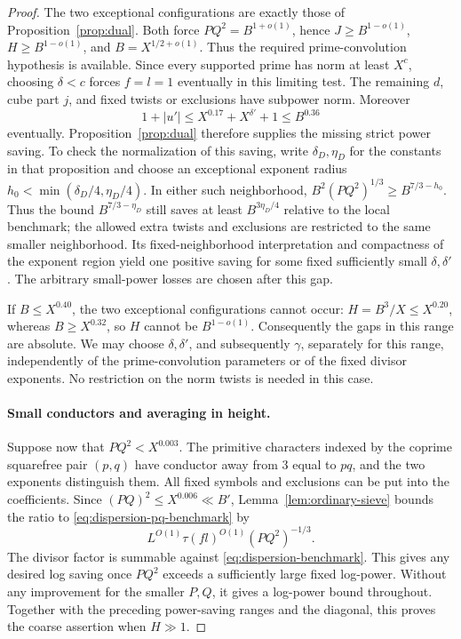 \begin{proof}
The two exceptional configurations are exactly those of
Proposition~\ref{prop:dual}. Both force $PQ^2=B^{1+o(1)}$, hence
$J\ge B^{1-o(1)}$, $H\ge B^{1-o(1)}$, and
$B=X^{1/2+o(1)}$. Thus the required prime-convolution hypothesis is
available. Since every supported prime has norm at least $X^c$, choosing
$\delta<c$ forces $f=l=1$ eventually in this limiting test.
The remaining $d$, cube part $j$, and fixed twists or exclusions have
subpower norm. Moreover
\[
 1+|u'|\le X^{0.17}+X^{\delta'}+1\le B^{0.36}
\]
eventually. Proposition~\ref{prop:dual} therefore supplies the missing
strict power saving. To check the normalization of this saving, write
$\delta_D,\eta_D$ for the constants in that proposition and choose an
exceptional exponent radius $h_0<\min(\delta_D/4,\eta_D/4)$.
In either such neighborhood,
$B^2(PQ^2)^{1/3}\ge B^{7/3-h_0}$.
Thus the bound $B^{7/3-\eta_D}$ still saves at least
$B^{3\eta_D/4}$ relative to the local benchmark; the allowed extra
twists and exclusions are restricted to the same smaller neighborhood.
Its fixed-neighborhood interpretation and
compactness of the exponent region yield one positive saving for some
fixed sufficiently small $\delta,\delta'$. The arbitrary small-power
losses are chosen after this gap.

If $B\le X^{0.40}$, the two exceptional configurations cannot occur:
$H=B^3/X\le X^{0.20}$, whereas $B\ge X^{0.32}$, so $H$ cannot be
$B^{1-o(1)}$. Consequently the gaps in this range are absolute. We may
choose $\delta,\delta'$, and subsequently $\gamma$, separately for
this range, independently of the prime-convolution parameters or of
the fixed divisor exponents. No restriction on the norm twists is
needed in this case.

\paragraph{Small conductors and averaging in height.}
Suppose now that $PQ^2<X^{0.003}$. The primitive characters indexed by
the coprime squarefree pair $(p,q)$ have conductor away from $3$ equal
to $pq$, and the two exponents distinguish them. All fixed symbols and
exclusions can be put into the coefficients. Since
$(PQ)^2\le X^{0.006}\ll B'$, Lemma~\ref{lem:ordinary-sieve} bounds
the ratio to \eqref{eq:dispersion-pq-benchmark} by
\begin{equation}
 L^{O(1)}\tau(fl)^{O(1)}(PQ^2)^{-1/3}.
 \label{eq:dispersion-small-conductor}
\end{equation}
The divisor factor is summable against
\eqref{eq:dispersion-benchmark}. This gives any desired log saving
once $PQ^2$ exceeds a sufficiently large fixed log-power. Without any
improvement for the smaller $P,Q$, it gives a log-power bound throughout.
Together with the preceding power-saving ranges and the diagonal, this
proves the coarse assertion when $H\gg1$.


\end{proof}
